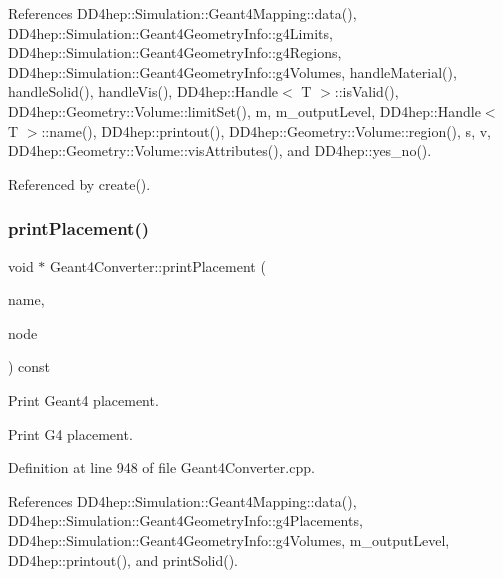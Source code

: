 References D\+D4hep\+::\+Simulation\+::\+Geant4\+Mapping\+::data(), D\+D4hep\+::\+Simulation\+::\+Geant4\+Geometry\+Info\+::g4\+Limits, D\+D4hep\+::\+Simulation\+::\+Geant4\+Geometry\+Info\+::g4\+Regions, D\+D4hep\+::\+Simulation\+::\+Geant4\+Geometry\+Info\+::g4\+Volumes, handle\+Material(), handle\+Solid(), handle\+Vis(), D\+D4hep\+::\+Handle$<$ T $>$\+::is\+Valid(), D\+D4hep\+::\+Geometry\+::\+Volume\+::limit\+Set(), m, m\+\_\+output\+Level, D\+D4hep\+::\+Handle$<$ T $>$\+::name(), D\+D4hep\+::printout(), D\+D4hep\+::\+Geometry\+::\+Volume\+::region(), s, v, D\+D4hep\+::\+Geometry\+::\+Volume\+::vis\+Attributes(), and D\+D4hep\+::yes\+\_\+no().



Referenced by create().

\hypertarget{class_d_d4hep_1_1_simulation_1_1_geant4_converter_a2269a0b7dd982c40cfcdee82089870fe}{}\label{class_d_d4hep_1_1_simulation_1_1_geant4_converter_a2269a0b7dd982c40cfcdee82089870fe} 
\subsubsection{\texorpdfstring{print\+Placement()}{printPlacement()}}
{\footnotesize\ttfamily void $\ast$ Geant4\+Converter\+::print\+Placement (\begin{DoxyParamCaption}\item[{const std\+::string \&}]{name,  }\item[{const T\+Geo\+Node $\ast$}]{node }\end{DoxyParamCaption}) const\hspace{0.3cm}{\ttfamily [virtual]}}



Print Geant4 placement. 

Print G4 placement. 

Definition at line 948 of file Geant4\+Converter.\+cpp.



References D\+D4hep\+::\+Simulation\+::\+Geant4\+Mapping\+::data(), D\+D4hep\+::\+Simulation\+::\+Geant4\+Geometry\+Info\+::g4\+Placements, D\+D4hep\+::\+Simulation\+::\+Geant4\+Geometry\+Info\+::g4\+Volumes, m\+\_\+output\+Level, D\+D4hep\+::printout(), and print\+Solid().


